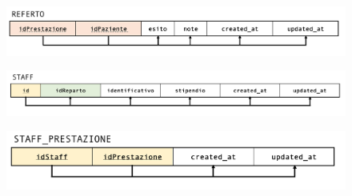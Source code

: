 \documentclass[paper=a4, fontsize=11pt,x11names]{report}
\begin{document}
\begin{figure}[H]
\begin{center}
\includegraphics[scale=0.4]{immagini_normalizzazione/referto}
\end{center}
\end{figure}

\begin{figure}[H]
\begin{center}
\includegraphics[scale=0.4]{immagini_normalizzazione/staff}
\end{center}
\end{figure}

\begin{figure}[H]
\begin{center}
\includegraphics[scale=0.4]{immagini_normalizzazione/staff_prestazione}
\end{center}
\end{figure}
\end{document}
